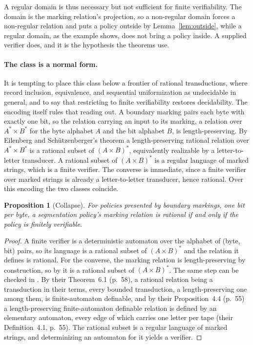 \documentclass[11pt,a4paper]{article}
\theoremstyle{definition}
\theoremstyle{plain}
\newtheorem{proposition}{Proposition}
\begin{document}
A regular domain is thus necessary but not sufficient for finite verifiability. The domain is the marking relation's
projection, so a non-regular domain forces a non-regular relation and puts a policy outside by Lemma~\ref{lem:outside},
while a regular domain, as the example shows, does not bring a policy inside. A supplied verifier does, and it is the
hypothesis the theorems use.

\paragraph{The class is a normal form.} It is tempting to place this class below a frontier of rational transductions,
where \citet{filiot2016equivalence} record inclusion, equivalence, and sequential uniformization as undecidable in
general, and to say that restricting to finite verifiability restores decidability. The encoding itself rules that
reading out. A boundary marking pairs each byte with exactly one bit, so the relation carrying an input to its marking,
a relation over $A^{*} \times B^{*}$ for the byte alphabet $A$ and the bit alphabet $B$, is length-preserving. By
Eilenberg and Schützenberger's theorem \citep{eilenberg1974automata} a length-preserving rational relation over
$A^{*} \times B^{*}$ is a rational subset of $(A \times B)^{*}$, equivalently realizable by a letter-to-letter
transducer. A rational subset of $(A \times B)^{*}$ is a regular language of marked strings, which is a finite verifier.
The converse is immediate, since a finite verifier over marked strings is already a letter-to-letter transducer, hence
rational. Over this encoding the two classes coincide.

\begin{proposition}[Collapse]\label{prop:collapse} For policies presented by boundary markings, one bit per byte, a
segmentation policy's marking relation is rational if and only if the policy is finitely verifiable.
\end{proposition}

\begin{proof}
A finite verifier is a deterministic automaton over the alphabet of (byte, bit) pairs, so its language is a rational
subset of $(A \times B)^{*}$ and the relation it defines is rational. For the converse, the marking relation is
length-preserving by construction, so by \citet{eilenberg1974automata} it is a rational subset of $(A \times B)^{*}$.
The same step can be checked in \citet{elgot1965relations}. By their Theorem~6.1 (p.~58), a rational relation being a
transduction in their terms, every bounded transduction, a length-preserving one among them, is finite-automaton
definable, and by their Proposition~4.4 (p.~55) a length-preserving finite-automaton definable relation is defined by an
elementary automaton, every edge of which carries one letter per tape (their Definition~4.1, p.~55). The rational subset
is a regular language of marked strings, and determinizing an automaton for it yields a verifier.
\end{proof}
\end{document}
